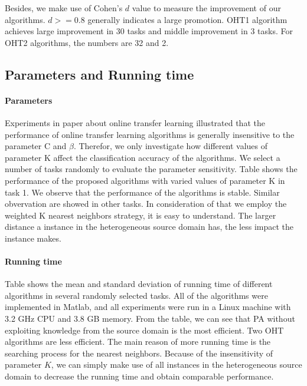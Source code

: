 \documentclass[twocolumn]{article}
\begin{document}
Besides, we make use of Cohen's $d$ value to measure the improvement of our algorithms.
$d >= 0.8$ generally indicates a large promotion.
OHT1 algorithm achieves large improvement in 30 tasks and middle improvement in 3 tasks.
For OHT2 algorithms, the numbers are 32 and 2.

\subsection{Parameters and Running time}
\paragraph{Parameters}
Experiments in paper about online transfer learning illustrated that the performance of online transfer learning algorithms is generally insensitive to the parameter C and $\beta$.
Therefor, we only investigate how different values of parameter K affect the classification accuracy of the algorithms.
We select a number of tasks randomly to evaluate the parameter sensitivity.
Table shows the performance of the proposed algorithms with varied values of parameter K in task 1.
We observe that the performance of the algorithms is stable.
Similar obvervation are showed in other tasks.
In consideration of that we employ the weighted K nearest neighbors strategy, it is easy to understand.
The larger distance a instance in the heterogeneous source domain has, the less impact the instance makes.


\paragraph{Running time}
Table shows the mean and standard deviation of running time of different algorithms in several randomly selected tasks.
All of the algorithms were implemented in Matlab, and all experiments were run in a Linux machine with 3.2 GHz CPU and 3.8 GB memory.
From the table, we can see that PA without exploiting knowledge from the source domain is the most efficient.
Two OHT algorithms are less efficient.
The main reason of more running time is the searching process for the nearest neighbors.
Because of the insensitivity of parameter $K$, we can simply make use of all instances in the heterogeneous source domain to decrease the running time and obtain comparable performance.
\end{document}
